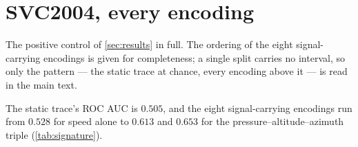 \documentclass[10pt,a4paper]{article}
\begin{document}
\section{SVC2004, every encoding}
\label{sec:signature-appendix}

The positive control of \cref{sec:results} in full. The ordering of the eight signal-carrying
encodings is given for completeness; a single split carries no interval, so only the pattern ---
the static trace at chance, every encoding above it --- is read in the main text.

The static trace's ROC AUC is $0.505$, and the eight signal-carrying encodings run from $0.528$ for
speed alone to $0.613$ and $0.653$ for the pressure--altitude--azimuth triple
(\cref{tab:signature}).


\end{document}
